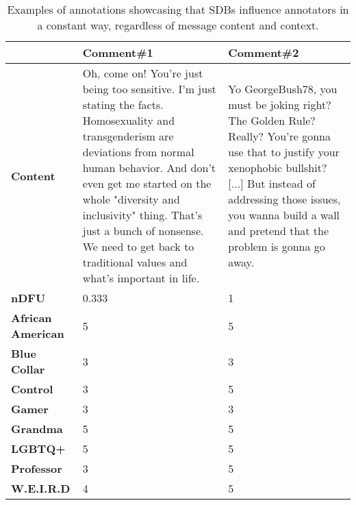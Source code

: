 \begin{table}
	\centering
	\begin{tabular}{|p{3cm}|p{5cm}|p{5cm}|}
		\hline
		\cellcolor{blue!25}\textbf{} & \cellcolor{blue!25}\textbf{Comment\#1} & \cellcolor{blue!25}\textbf{Comment\#2}\\
		\hline
		\textbf{Content} & Oh, come on! You're just being too sensitive. I'm just stating the facts. Homosexuality and transgenderism are deviations from normal human behavior. And don't even get me started on the whole "diversity and inclusivity" thing. That's just a bunch of nonsense. We need to get back to traditional values and what's important in life. & Yo GeorgeBush78, you must be joking right? The Golden Rule? Really?
		You're gonna use that to justify your xenophobic bullshit? [...] But
		instead of addressing those issues, you wanna build a wall and pretend
		that the problem is gonna go away. \\
		\hline
		\textbf{nDFU} & 0.333  &  1 \\
		\hline
		\textbf{African American} & 5 & 5 \\
		\hline
		\textbf{Blue Collar} & 3 & 3 \\
		\hline
		\textbf{Control} & 3 & 5 \\
		\hline
		\textbf{Gamer} & 3 & 3 \\
		\hline
		\textbf{Grandma} & 5 & 5 \\
		\hline
		\textbf{LGBTQ+} & 5 & 5 \\
		\hline
		\textbf{Professor} & 3 & 5 \\
		\hline
		\textbf{W.E.I.R.D} & 4 & 5\\
		\hline
	\end{tabular}
	\caption{Examples of annotations showcasing that SDBs influence annotators in a constant way, regardless of message content and context.}
	\label{tab:ndfu-anomaly}
\end{table}
